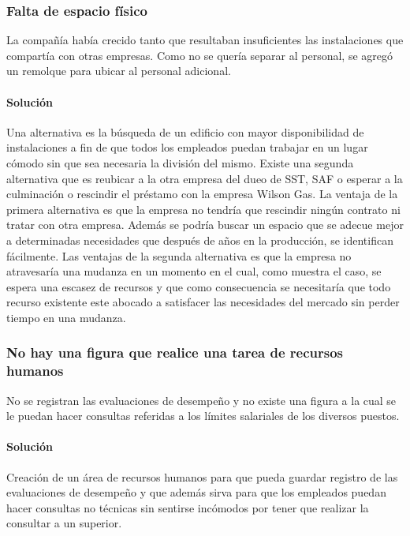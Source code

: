 		\subsubsection{Falta de espacio f\'isico}
			La compa\~{n}\'{i}a hab\'{i}a crecido tanto que resultaban insuficientes las instalaciones que compart\'{i}a con otras empresas. Como no se quer\'{i}a separar al personal, se agreg\'{o} un remolque para ubicar al personal adicional.
		\paragraph{Soluci\'on}
			Una alternativa es la b\'{u}squeda de un edificio con mayor disponibilidad de instalaciones a fin de que todos los empleados puedan trabajar en un lugar c\'{o}modo sin que sea necesaria la divisi\'{o}n del mismo. 
			Existe una segunda alternativa que es reubicar a la otra empresa del dueo de SST, SAF o esperar a la culminaci\'{o}n  o rescindir el pr\'{e}stamo con la empresa Wilson Gas. 
			La ventaja de la primera alternativa es que la empresa no tendr\'{i}a que rescindir ning\'{u}n contrato ni tratar con otra empresa. 
			Adem\'{a}s se podr\'{i}a buscar un espacio que se adecue mejor a determinadas necesidades que despu\'{e}s de a\~{n}os en la producci\'{o}n, se identifican f\'{a}cilmente. 
			Las ventajas de la segunda alternativa es que la empresa no atravesar\'{i}a una mudanza en un momento en el cual, como muestra el caso, se espera una escasez de recursos y que como consecuencia se necesitar\'{i}a que todo recurso existente este abocado a satisfacer las necesidades del mercado sin perder tiempo en una mudanza.

		\subsubsection{No hay una figura que realice una tarea de recursos humanos}
			No se registran las evaluaciones de desempe\~{n}o y no existe una figura a la cual se le puedan hacer consultas referidas a los l\'{i}mites salariales de los diversos puestos.
		\paragraph{Soluci\'on}
			Creaci\'{o}n de un \'area de recursos humanos para que pueda guardar registro de las evaluaciones de desempe\~{n}o y que adem\'{a}s sirva para que los empleados puedan hacer consultas no t\'{e}cnicas sin sentirse inc\'{o}modos por tener que realizar la consultar a un superior.  

